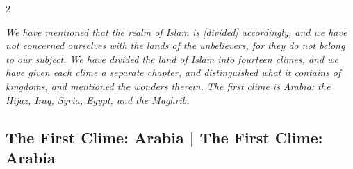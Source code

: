 \documentclass[11pt,a4paper]{article}
\begin{document}
\begin{paracol}{2}

\switchcolumn[0]
\begin{flushright}
{\small\arabicfont
{}}
\end{flushright}

\switchcolumn[1]
\begin{flushleft}
\small
\textit{We have mentioned that the realm of Islam is [divided] accordingly, and we have not concerned ourselves with the lands of the unbelievers, for they do not belong to our subject. We have divided the land of Islam into fourteen climes, and we have given each clime a separate chapter, and distinguished what it contains of kingdoms, and mentioned the wonders therein. The first clime is Arabia: the Hijaz, Iraq, Syria, Egypt, and the Maghrib.}
\end{flushleft}

\end{paracol}

\vspace{0.3cm}

\subsection{The First Clime: Arabia | The First Clime: Arabia}
\end{document}
